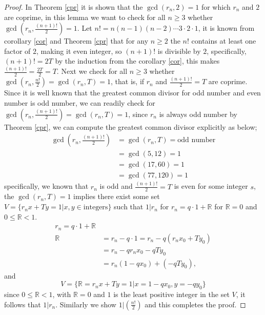 \documentclass[pdflatex,sn-mathphys-num]{sn-jnl}%
\theoremstyle{thmstyleone}%
\theoremstyle{thmstyletwo}%
\theoremstyle{thmstylethree}%
\begin{document}
\begin{proof}
In Theorem \ref{cpr} it is shown that the $\gcd(r_{n},2)=1$ for which $r_n$ and $2$ are coprime, in this lemma we want to check for all $n\geq 3$ whether $\gcd(r_{n},\frac{(n+1)!}{2})=1$. 
Let $n!=n(n-1)(n-2)\cdots 3\cdotp 2\cdotp 1$, it is known from corollary \ref{cor} and Theorem \ref{cpr} that for any $n\geq 2$ the $n!$ contains at least one factor of $2$, making it even integer, so $ (n+1)!$ is divisible by $2$, specifically, $(n+1)!=2T$ by the induction from the corollary \ref{cor}, this makes $\frac{(n+1)!}{2}=\frac{2T}{2}=T$.
Next we check for all $n\geq 3$ whether $\gcd(r_{n},\frac{n!}{2})=\gcd(r_{n},T)=1$, that is, if $r_n$ and $\frac{(n+1)!}{2}=T$ are coprime. Since it is well known that the greatest common divisor for odd number and even number is odd number, we can readily check for $\gcd(r_{n},\frac{(n+1)!}{2})=\gcd(r_{n},T)=1$, since $r_n$ is always odd number by Theorem \ref{cpr}, we can compute the greatest common divisor explicitly as below;
\begin{align*}
    \gcd \left(r_n, \frac{(n+1)!}{2}\right)&=\gcd \left(r_n, T\right)=\mbox{odd number}\\
    &=\gcd(5,12)=1\\
    &=\gcd(17,60)=1\\
    &=\gcd(77, 120)=1
\end{align*}
specifically, we known that $r_n$ is odd and $\frac{(n+1)!}{2}=T$ is even for some integer $s$, the $\gcd(r_{n},T)=1$ implies there exist some set $V=\lbrace{r_n x + T y=1|x, y\in \mbox{integers}  \rbrace}$ such that $1|r_n$ for $ r_n=q\cdotp1+\mathbb{R}$ for $\mathbb{R}=0$ and $0\leq \mathbb{R}<1.$
\begin{align*}
    r_n=q\cdotp1+\mathbb{R}\\
    \mathbb{R}&=r_n - q\cdotp1= r_n - q(r_n x_0 + Ty_0  )\\
    &=r_n -qr_n x_0 - qT y_0\\
    &=r_n(1-qx_0) + (-qT y_0),
\end{align*}
and $$V=\lbrace{\mathbb{R}=r_n x + T y=1|x=1-qx_0, y=-qy_0  \rbrace}$$ since  $0\leq \mathbb{R}<1$, with $\mathbb{R}=0$ and $1$ is the least positive integer in the set $V$, it follows that $1|r_n.$ Similarly we show $1|(\frac{n!}{2})$ and this completes the proof.
\end{proof}
\end{document}
